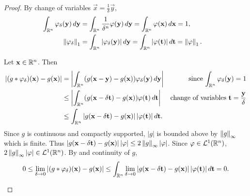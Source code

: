 \begin{proof}
By change of variables $\vec{x} = \frac{1}{\delta} \vec{y}$,
\begin{align*}
    \int_{{\mathbb R}^n} \varphi_{\delta} (\mathbf{y}) \,d\mathbf{y} &= \int_{{\mathbb R}^n} \frac{1}{\delta^n} \varphi(\mathbf{y}) \,d\mathbf{y}= \int_{{\mathbb R}^n} \varphi(\mathbf{x}) \,d\mathbf{x} = 1, & \\ 
     \left\lVert\varphi_\delta\right\rVert_1 &= \int_{{\mathbb R}^n} |\varphi_{\delta} (\mathbf{y})| \,d\mathbf{y} =  \int_{{\mathbb R}^n} |\varphi (\mathbf{t})| \,d\mathbf{t} = \left\lVert\varphi\right\rVert_1.
\end{align*}
\setcounter{step}{0}
\begin{step}[Proof of $1$]
    Let $\mathbf{x} \in {\mathbb R}^n$. Then \begin{align*}
        | (g \ast \varphi_\delta)(\mathbf{x}) - g(\mathbf{x}) | &=  \left | \int_{{\mathbb R}^n} (g (\mathbf{x} - \mathbf{y}) - g(\mathbf{x})) \varphi_\delta (\mathbf{y}) \,d\mathbf{y} \right | & \text{since $ \int_{{\mathbb R}^n} \varphi_{\delta} (\mathbf{y}) = 1$} & \\
        &\leq  \left |  \int_{{\mathbb R}^n} (g (\mathbf{x} - \delta \mathbf{t}) - g(\mathbf{x})) \varphi (\mathbf{t}) \,d\mathbf{t}  \right |& \text{change of variables $\mathbf{t} = \frac{\mathbf{y}}{\delta} $} & \\
        &\leq \int_{{\mathbb R}^n} \left | g (\mathbf{x} - \delta \mathbf{t}) - g(\mathbf{x}) \right | |\varphi(\mathbf{t})| \,d\mathbf{t}.
    \end{align*}
Since $g$ is continuous and compactly supported, $|g|$ is bounded above by $\left\lVert g\right\rVert_\infty$ which is finite. Thus $\left | g (\mathbf{x} - \delta \mathbf{t}) - g(\mathbf{x}) \right | |\varphi| \leq 2 \left\lVert g\right\rVert_\infty |\varphi|$. Since $\varphi \in {\mathcal {L}^1}({\mathbb R}^n)$, $2 \left\lVert g\right\rVert_\infty |\varphi| \in {\mathcal {L}^1}({\mathbb R}^n)$. By  and continuity of $g$, \begin{align*}
    0 \leq \lim_{\delta \to 0}| (g \ast \varphi_\delta)(\mathbf{x}) - g(\mathbf{x}) | \leq \int_{{\mathbb R}^n}  \lim_{\delta \to 0} \left | g (\mathbf{x} - \delta \mathbf{t}) - g(\mathbf{x}) \right | |\varphi(\mathbf{t})| \,d\mathbf{t} = 0.
\end{align*}
\end{step}


\end{proof}
